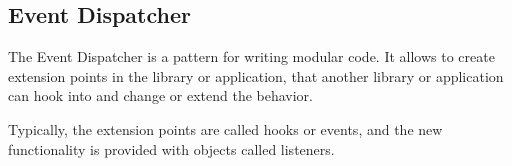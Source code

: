 \tocless\subsection{Event Dispatcher} \label{sec:theory:event-dispatcher}

The Event Dispatcher is a pattern for writing modular code. It allows to create extension points in the library or application, that another library or application can hook into and change or extend the behavior.

Typically, the extension points are called hooks or events, and the new functionality is provided with objects called listeners.
